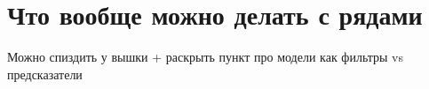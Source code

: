 \section{Что вообще можно делать с рядами}

Можно спиздить у вышки + раскрыть пункт про модели как фильтры vs предсказатели
